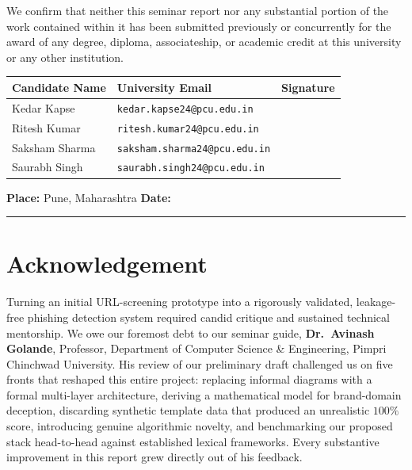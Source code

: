 \documentclass[12pt,a4paper]{report}
\begin{document}
We confirm that neither this seminar report nor any substantial portion of the work contained within it has been submitted previously or concurrently for the award of any degree, diploma, associateship, or academic credit at this university or any other institution.

\vspace{0.22in}
\begin{center}
\renewcommand{\arraystretch}{1.45}
\begin{tabular}{|p{}|p{}|p{}|}
\hline
\textbf{Candidate Name} & \textbf{University Email} & \textbf{Signature} \\
\hline
Kedar Kapse    & \texttt{kedar.kapse24@pcu.edu.in}    & \\
\hline
Ritesh Kumar   & \texttt{ritesh.kumar24@pcu.edu.in}   & \\
\hline
Saksham Sharma & \texttt{saksham.sharma24@pcu.edu.in} & \\
\hline
Saurabh Singh  & \texttt{saurabh.singh24@pcu.edu.in}  & \\
\hline
\end{tabular}
\end{center}

\vfill
\noindent\textbf{Place:} Pune, Maharashtra \hfill \textbf{Date:} \rule{1.4in}{0.4pt}
\clearpage

\chapter*{Acknowledgement}
{}
\vspace*{-8pt}

Turning an initial URL-screening prototype into a rigorously validated, leakage-free phishing detection system required candid critique and sustained technical mentorship. We owe our foremost debt to our seminar guide, \textbf{Dr.\ Avinash Golande}, Professor, Department of Computer Science \& Engineering, Pimpri Chinchwad University. His review of our preliminary draft challenged us on five fronts that reshaped this entire project: replacing informal diagrams with a formal multi-layer architecture, deriving a mathematical model for brand-domain deception, discarding synthetic template data that produced an unrealistic $100\%$ score, introducing genuine algorithmic novelty, and benchmarking our proposed stack head-to-head against established lexical frameworks. Every substantive improvement in this report grew directly out of his feedback.
\end{document}
